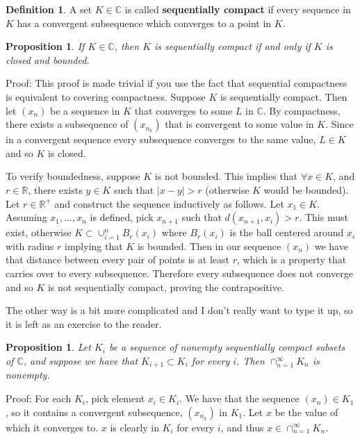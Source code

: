 \documentclass[11pt]{article}
\theoremstyle{plain}
\newtheorem{proposition}[theorem]{Proposition}
\theoremstyle{definition}
\newtheorem{definition}[theorem]{Definition}
\begin{document}
\begin{definition}
A set $K \in \mathbb{C}$ is called \textbf{sequentially compact} if every sequence in $K$ has a convergent subsequence which converges to a point in $K$.
\end{definition}

\begin{proposition}
If $K \in \mathbb{C}$, then $K$ is sequentially compact if and only if $K$ is closed and bounded.
\end{proposition}

Proof: This proof is made trivial if you use the fact that sequential compactness is equivalent to covering compactness. Suppose $K$ is sequentially compact. Then let $(x_n)$ be a sequence in $K$ that converges to some $L$ in $\mathbb{C}$. By compactness, there exists a subsequence of $(x_{n_k})$ that is convergent to some value in $K$. Since in a convergent sequence every subsequence converges to the same value, $L \in K$ and so $K$ is closed. 

To verify boundedness, suppose $K$ is not bounded. This implies that $\forall x \in K$, and $r \in \mathbb{R}$, there exists $y \in K$ such that $|x - y| > r$ (otherwise $K$ would be bounded). Let $r \in \mathbb{R}^{+}$ and construct the sequence inductively as follows. Let  $x_1 \in K$. Assuming $x_1, ..., x_n$ is defined, pick $x_{n+1}$ such that $d(x_{n+1}, x_{i}) > r$. This must exist, otherwise $K \subset \cup_{i = 1}^{n} B_{r}(x_i)$ where $B_r(x_i)$ is the ball centered around $x_i$ with radius $r$ implying that $K$ is bounded. Then in our sequence $(x_n)$ we have that distance between every pair of points is at least $r$, which is a property that carries over to every subsequence. Therefore every subsequence does not converge and so $K$ is not sequentially compact, proving the contrapositive.

The other way is a bit more complicated and I don't really want to type it up, so it is left as an exercise to the reader.

\begin{proposition}
Let $K_i$ be a sequence of nonempty sequentially compact subsets of $\mathbb{C}$, and suppose we have that $K_{i+1} \subset K_{i}$ for every $i$. Then $\cap_{n=1}^{\infty}K_n$ is nonempty.
\end{proposition}

Proof: For each $K_i$, pick element $x_i \in K_i$. We have that the sequence $(x_n) \in K_1$, so it contains a convergent subsequence, $(x_{n_k})$ in $K_1$. Let $x$ be the value of which it converges to. $x$ is clearly in $K_i$ for every $i$, and thus $x \in \cap_{n=1}^{\infty}K_n$.
\end{document}
